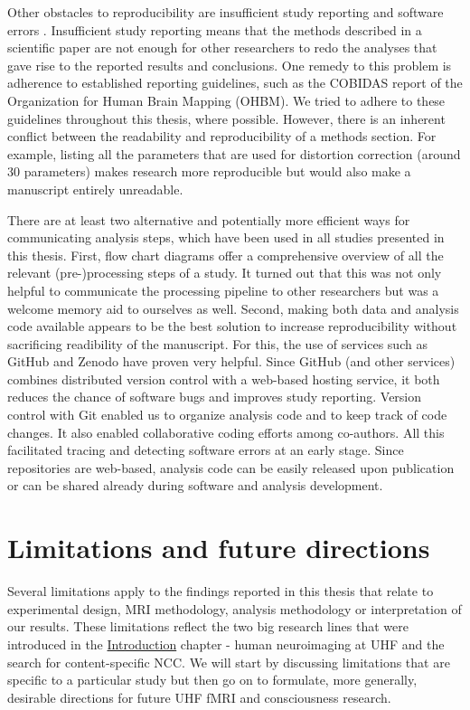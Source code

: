 Other obstacles to reproducibility are insufficient study reporting and software errors \parencite{Eklund2016}. Insufficient study reporting means that the methods described in a scientific paper are not enough for other researchers to redo the analyses that gave rise to the reported results and conclusions. One remedy to this problem is adherence to established reporting guidelines, such as the COBIDAS report \parencite{Nichols2017} of the Organization for Human Brain Mapping (OHBM). We tried to adhere to these guidelines throughout this thesis, where possible. However, there is an inherent conflict between the readability and reproducibility of a methods section. For example, listing all the parameters that are used for distortion correction (around 30 parameters) makes research more reproducible but would also make a manuscript entirely unreadable.

There are at least two alternative and potentially more efficient ways for communicating analysis steps, which have been used in all studies presented in this thesis. First, flow chart diagrams offer a comprehensive overview of all the relevant (pre-)processing steps of a study. It turned out that this was not only helpful to communicate the processing pipeline to other researchers but was a welcome memory aid to ourselves as well. Second, making both data and analysis code available appears to be the best solution to increase reproducibility without sacrificing readibility of the manuscript. For this, the use of services such as GitHub and Zenodo have proven very helpful. Since GitHub (and other services) combines distributed version control with a web-based hosting service, it both reduces the chance of software bugs and improves study reporting. Version control with Git enabled us to organize analysis code and to keep track of code changes. It also enabled collaborative coding efforts among co-authors. All this facilitated tracing and detecting software errors at an early stage. Since repositories are web-based, analysis code can be easily released upon publication or can be shared already during software and analysis development.

\section{Limitations and future directions}
Several limitations apply to the findings reported in this thesis that relate to experimental design, MRI methodology, analysis methodology or interpretation of our results. These limitations reflect the two big research lines that were introduced in the \hyperref[ch:chapter01]{Introduction} chapter - human neuroimaging at UHF and the search for content-specific NCC. We will start by discussing limitations that are specific to a particular study but then go on to formulate, more generally, desirable directions for future UHF fMRI and consciousness research.

